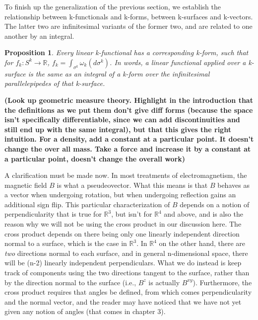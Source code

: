 \documentclass{book}
\newtheorem{prop}[equation]{Proposition}
\begin{document}
To finish up the generalization of the previous section, we establish the relationship between k-functionals and k-forms, between k-surfaces and k-vectors. The latter two are infinitesimal variants of the former two, and are related to one another by an integral. 


\begin{prop}
	Every linear k-functional has a corresponding k-form, such that for $f_k : S^k \to \mathbb{R}$, $f_k = \int_{\sigma^k} \omega_k(d\sigma^k)$. In words, a linear functional applied over a k-surface is the same as an integral of a k-form over the infinitesimal parallelepipedes of that k-surface. 
\end{prop}

\textbf{(Look up geometric measure theory. Highlight in the introduction that the definitions as we put them don't give diff forms (because the space isn't specifically differentiable, since we can add discontinuities and still end up with the same integral), but that this gives the right intuition. For a density, add a constant at a particular point. It doesn't change the over all mass. Take a force and increase it by a constant at a particular point, doesn't change the overall work)}

A clarification must be made now. In most treatments of electromagnetism, the magnetic field $B$ is what a pseudeovector. What this means is that $B$ behaves as a vector when undergoing rotation, but when undergoing reflection gains an additional sign flip. This particular characterization of $B$ depends on a notion of perpendicularity that is true for $\mathbb{R}^3$, but isn't for $\mathbb{R}^4$ and above, and is also the reason why we will not be using the cross product in our discussion here. The cross product depends on there being only one linearly independent direction normal to a surface, which is the case in $\mathbb{R}^3$. In $\mathbb{R}^4$ on the other hand, there are \emph{two} directions normal to each surface, and in general n-dimensional space, there will be (n-2) linearly independent perpendiculars. What we do instead is keep track of components using the two directions tangent to the surface, rather than by the direction normal to the surface (i.e., $B^z$ is actually $B^{xy}$). Furthermore, the cross product requires that angles be defined, from which comes perpendicularity and the normal vector, and the reader may have noticed that we have not yet given any notion of angles (that comes in chapter 3). 
\end{document}
